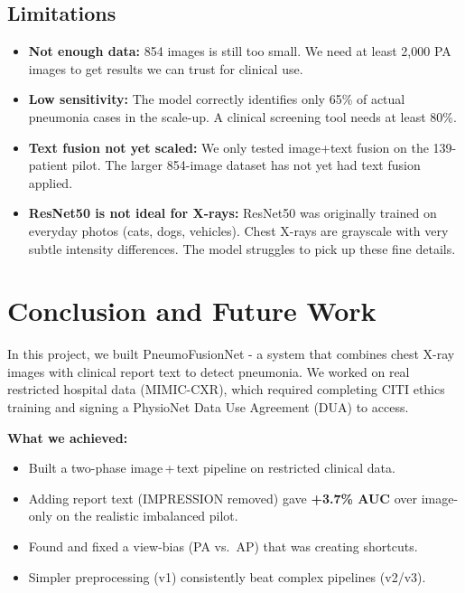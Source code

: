 \documentclass{article}
\begin{document}
\subsection{Limitations}

\begin{itemize}[noitemsep, leftmargin=*]
  \item \textbf{Not enough data:} 854 images is still too small. We need
        at least 2{,}000 PA images to get results we can trust for clinical use.
  \item \textbf{Low sensitivity:} The model correctly identifies only 65\%
        of actual pneumonia cases in the scale-up. A clinical screening
        tool needs at least 80\%.
  \item \textbf{Text fusion not yet scaled:} We only tested image+text
        fusion on the 139-patient pilot. The larger 854-image dataset
        has not yet had text fusion applied.
  \item \textbf{ResNet50 is not ideal for X-rays:} ResNet50 was originally
        trained on everyday photos (cats, dogs, vehicles). Chest X-rays are
        grayscale with very subtle intensity differences. The model struggles
        to pick up these fine details.
\end{itemize}

\section{Conclusion and Future Work}

In this project, we built PneumoFusionNet - a system that combines chest
X-ray images with clinical report text to detect pneumonia. We worked on real
restricted hospital data (MIMIC-CXR), which required completing CITI ethics
training and signing a PhysioNet Data Use Agreement (DUA) to access.

\textbf{What we achieved:}
\begin{itemize}[noitemsep, leftmargin=*, topsep=2pt]
  \item Built a two-phase image\,+\,text pipeline on restricted clinical data.
  \item Adding report text (IMPRESSION removed) gave \textbf{+3.7\% AUC}
        over image-only on the realistic imbalanced pilot.
  \item Found and fixed a view-bias (PA vs.\ AP) that was creating shortcuts.
  \item Simpler preprocessing (v1) consistently beat complex pipelines (v2/v3).
\end{itemize}
\end{document}
